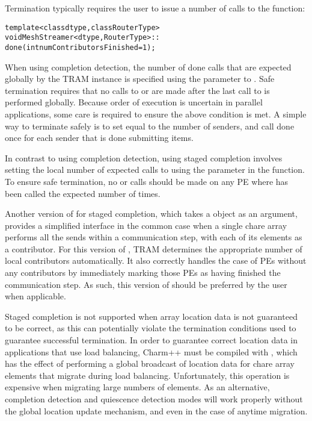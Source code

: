 Termination typically requires the user to issue a number of calls to the
 function:
\begin{alltt}
template <class dtype, class RouterType>
void MeshStreamer<dtype, RouterType>::
done(int numContributorsFinished = 1);
\end{alltt}
When using completion detection, the number of done calls that are expected
globally by the TRAM instance is specified using the 
parameter to . Safe termination requires that no calls to
 or  are made after the last call to
 is performed globally. Because order of execution is uncertain in
parallel applications, some care is required to ensure the above condition is
met. A simple way to terminate safely is to set  equal to
the number of senders, and call done once for each sender that is done
submitting items.

In contrast to using completion detection, using staged completion involves
setting the local number of expected calls to  using the
 parameter in the  function. To ensure
safe termination, no  or  calls should be made
on any PE where  has been called the expected number of times.

Another version of  for staged completion, which takes a
 object as an argument, provides a simplified interface in the
common case when a single chare array performs all the sends within a
communication step, with each of its elements as a contributor. For this version
of , TRAM determines the appropriate number of local contributors
automatically. It also correctly handles the case of PEs without any
contributors by immediately marking those PEs as having finished the
communication step. As such, this version of  should be preferred by
the user when applicable.

Staged completion is not supported when array location data is not guaranteed to
be correct, as this can potentially violate the termination conditions used to
guarantee successful termination. In order to guarantee correct location data in
applications that use load balancing, Charm++ must be compiled with
,
which has the effect of performing a global broadcast of location data for chare
array elements that migrate during load balancing. Unfortunately, this operation
is expensive when migrating large numbers of elements. As an alternative,
completion detection and quiescence detection modes will work properly without
the global location update mechanism, and even in the case of anytime migration.

